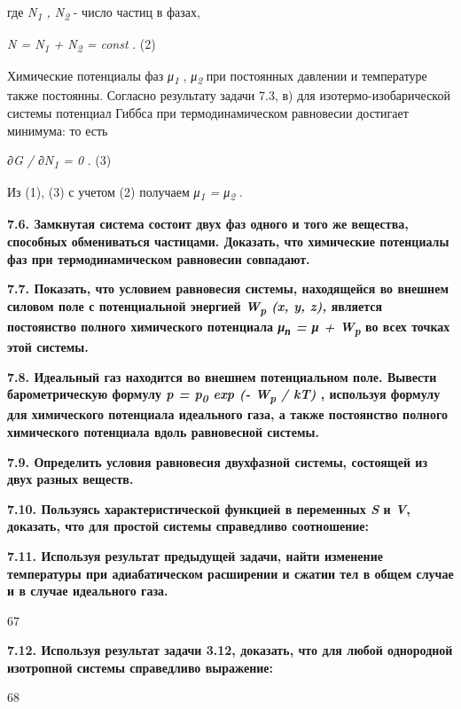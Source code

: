 где \emph{N\textsubscript{1} , N\textsubscript{2}} - число частиц в
фазах,

\emph{N = N\textsubscript{1} + N\textsubscript{2} = const} . (2)

Химические потенциалы фаз \emph{μ\textsubscript{1}} ,
\emph{μ\textsubscript{2}} при постоянных давлении и температуре также
постоянны. Согласно результату задачи 7.3, в) для изотермо-изобарической
системы потенциал Гиббса при термодинамическом равновесии достигает
минимума: то есть

\emph{∂G / ∂N\textsubscript{1} = 0} . (3)

Из (1), (3) с учетом (2) получаем \emph{μ\textsubscript{1} =
μ\textsubscript{2}} .

\textbf{7.6. Замкнутая система состоит двух фаз одного и того же
вещества, способных обмениваться частицами. Доказать, что химические
потенциалы фаз при термодинамическом равновесии совпадают.}

\textbf{7.7. Показать, что условием равновесия системы, находящейся во
внешнем силовом поле с потенциальной энергией \emph{W\textsubscript{p}
(x, y, z),} является постоянство полного химического потенциала
\emph{μ\textsubscript{п} = μ + W\textsubscript{p}} во всех точках этой
системы.}

\textbf{7.8. Идеальный газ находится во внешнем потенциальном поле.
Вывести барометрическую формулу \emph{p = p\textsubscript{0} exp (-
W\textsubscript{p} / kT)} , используя формулу для химического потенциала
идеального газа, а также постоянство полного химического потенциала
вдоль равновесной системы.}

\textbf{7.9. Определить условия равновесия двухфазной системы, состоящей
из двух разных веществ.}

\textbf{7.10. Пользуясь характеристической функцией в переменных
\emph{S} и \emph{V}, доказать, что для простой системы справедливо
соотношение:}


\textbf{7.11. Используя результат предыдущей задачи, найти изменение
температуры при адиабатическом расширении и сжатии тел в общем случае и
в случае идеального газа.}

67

\textbf{7.12. Используя результат задачи 3.12, доказать, что для любой
однородной изотропной системы справедливо выражение:}


68